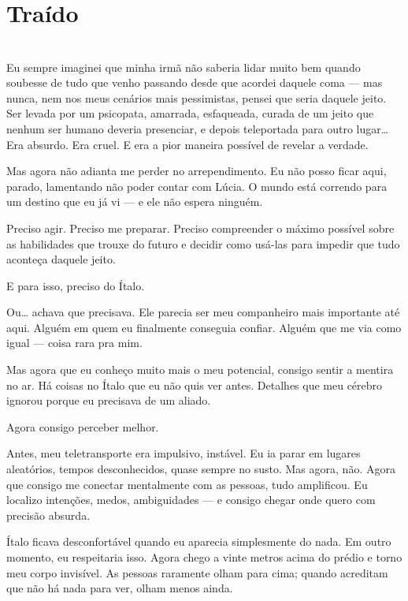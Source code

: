 \newpage
\ifdefined\useChapters
\chapter{Traído}
\else
\chapter{}
\fi

Eu sempre imaginei que minha irmã não saberia lidar muito bem quando soubesse de tudo que venho passando desde que acordei daquele coma — mas nunca, nem nos meus cenários mais pessimistas, pensei que seria daquele jeito. Ser levada por um psicopata, amarrada, esfaqueada, curada de um jeito que nenhum ser humano deveria presenciar, e depois teleportada para outro lugar…  
Era absurdo.  
Era cruel.  
E era a pior maneira possível de revelar a verdade.

Mas agora não adianta me perder no arrependimento.  
Eu não posso ficar aqui, parado, lamentando não poder contar com Lúcia.  
O mundo está correndo para um destino que eu já vi — e ele não espera ninguém.

Preciso agir.  
Preciso me preparar.  
Preciso compreender o máximo possível sobre as habilidades que trouxe do futuro e decidir como usá-las para impedir que tudo aconteça daquele jeito.

E para isso, preciso do Ítalo.

Ou… achava que precisava.  
Ele parecia ser meu companheiro mais importante até aqui.  
Alguém em quem eu finalmente conseguia confiar.
Alguém que me via como igual — coisa rara pra mim.

Mas agora que eu conheço muito mais o meu potencial, consigo sentir a mentira no ar.  
Há coisas no Ítalo que eu não quis ver antes.  
Detalhes que meu cérebro ignorou porque eu precisava de um aliado.

Agora consigo perceber melhor.

Antes, meu teletransporte era impulsivo, instável.  
Eu ia parar em lugares aleatórios, tempos desconhecidos, quase sempre no susto.  
Mas agora, não.  
Agora que consigo me conectar mentalmente com as pessoas, tudo amplificou.  
Eu localizo intenções, medos, ambiguidades — e consigo chegar onde quero com precisão absurda.

Ítalo ficava desconfortável quando eu aparecia simplesmente do nada. Em outro momento, eu respeitaria isso. Agora chego a vinte metros acima do prédio e torno meu corpo invisível. As pessoas raramente olham para cima; quando acreditam que não há nada para ver, olham menos ainda.

